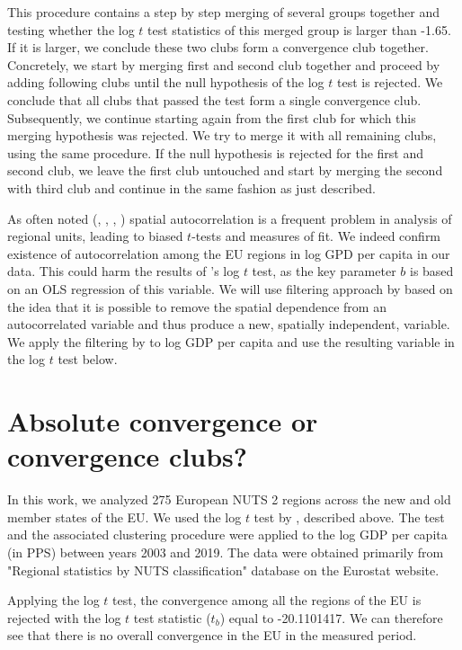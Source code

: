 \documentclass[11pt]{article}
\begin{document}
This procedure contains a step by step merging of several groups together and testing whether the log $t$ test statistics of this merged group is larger than -1.65. If it is larger, we conclude these two clubs form a convergence club together. Concretely, we start by merging first and second club together and proceed by adding following clubs until the null hypothesis of the log $t$ test is rejected. We conclude that all clubs that passed the test form a single convergence club. Subsequently, we continue starting again from the first club for which this merging hypothesis was rejected. We try to merge it with all remaining clubs, using the same procedure. If the null hypothesis is rejected for the first and second club, we leave the first club untouched and start by merging the second with third club and continue in the same fashion as just described.

As often noted (\citet{dall2008regional}, \citet{magrini2004regional}, \citet{anselin1991properties}, \citet{anselin2001spatial}) spatial autocorrelation is a frequent problem in analysis of regional units, leading to biased $t$-tests and measures of fit. We indeed confirm existence of autocorrelation among the EU regions in log GPD per capita in our data. This could harm the results of \citeauthor{phillips2007transition}'s log $t$ test, as the key parameter $b$ is based on an OLS regression of this variable. We will use filtering approach by \cite{getis2002comparative} based on the idea that it is possible to remove the spatial dependence from an autocorrelated variable and thus produce a new, spatially independent, variable. We apply the filtering by \cite{getis2002comparative} to log GDP per capita and use the resulting variable in the log $t$ test below.



\section{Absolute convergence or convergence clubs?}
In this work, we analyzed 275 European NUTS 2 regions across the new and old member states of the EU. We used the log $t$ test by \citet{phillips2009economic}, described above. The test and the associated clustering procedure were applied to the log GDP per capita (in PPS) between years 2003 and 2019. The data were obtained primarily from "Regional statistics by NUTS classification" database on the Eurostat website.

Applying the log $t$ test, the convergence among all the regions of the EU is rejected with the log $t$ test statistic ($t_b$) equal to -20.1101417. We can therefore see that there is no overall convergence in the EU in the measured period.
\end{document}
